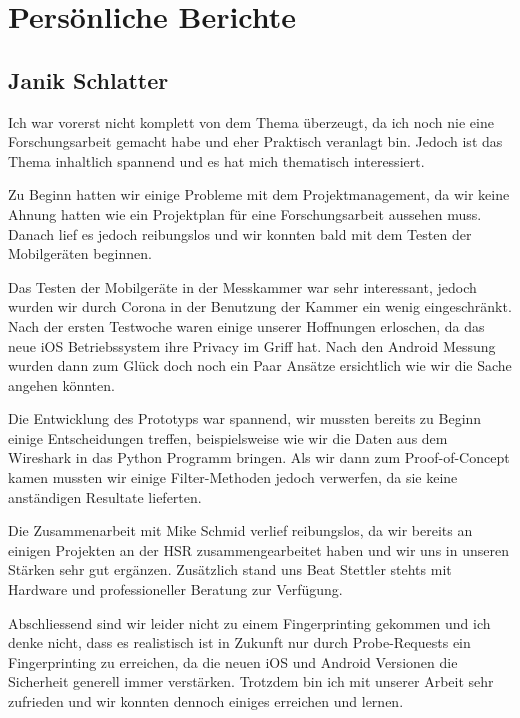 \chapter{Persönliche Berichte}
\cleardoublepage

\section*{Janik Schlatter}
Ich war vorerst nicht komplett von dem Thema überzeugt, da ich noch nie 
eine Forschungsarbeit gemacht habe und eher Praktisch veranlagt bin. 
Jedoch ist das Thema inhaltlich spannend und es hat mich thematisch interessiert.

Zu Beginn hatten wir einige Probleme mit dem Projektmanagement, da wir keine 
Ahnung hatten wie ein Projektplan für eine Forschungsarbeit aussehen muss. 
Danach lief es jedoch reibungslos und wir konnten bald mit dem Testen der 
Mobilgeräten beginnen.

Das Testen der Mobilgeräte in der Messkammer war sehr interessant, 
jedoch wurden wir durch Corona in der Benutzung der Kammer ein wenig 
eingeschränkt. Nach der ersten Testwoche waren einige unserer Hoffnungen 
erloschen, da das neue iOS Betriebssystem ihre Privacy im Griff hat. 
Nach den Android Messung wurden dann zum Glück doch noch ein Paar 
Ansätze ersichtlich wie wir die Sache angehen könnten.

Die Entwicklung des Prototyps war spannend, wir mussten bereits zu Beginn 
einige Entscheidungen treffen, beispielsweise wie wir die Daten aus dem 
Wireshark in das Python Programm bringen. Als wir dann zum Proof-of-Concept 
kamen mussten wir einige Filter-Methoden jedoch verwerfen, da sie keine 
anständigen Resultate lieferten. 

Die Zusammenarbeit mit Mike Schmid verlief reibungslos, 
da wir bereits an einigen Projekten an der HSR zusammengearbeitet
 haben und wir uns in unseren Stärken sehr gut ergänzen. Zusätzlich 
 stand uns Beat Stettler stehts mit Hardware und professioneller Beratung 
 zur Verfügung.

Abschliessend sind wir leider nicht zu einem Fingerprinting gekommen 
und ich denke nicht, dass es realistisch ist in Zukunft nur durch Probe-Requests 
ein Fingerprinting zu erreichen, da die neuen iOS und Android Versionen die 
Sicherheit generell immer verstärken. Trotzdem bin ich mit unserer Arbeit 
sehr zufrieden und wir konnten dennoch einiges erreichen und lernen.


\clearpage


